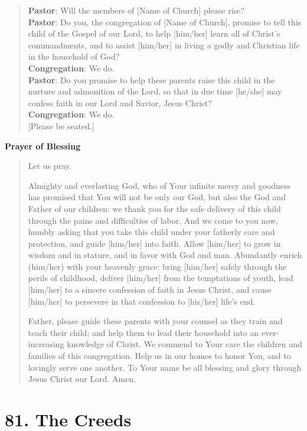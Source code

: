 \documentclass[
]{book}
\begin{document}
\begin{quote}
\textbf{Pastor}: Will the members of {[}Name of Church{]} please rise?\\
\textbf{Pastor}: Do you, the congregation of {[}Name of Church{]}, promise to tell this child of the Gospel of our Lord, to help {[}him/her{]} learn all of Christ's commandments, and to assist {[}him/her{]} in living a godly and Christian life in the household of God?\\
\textbf{Congregation}: We do.\\
\textbf{Pastor}: Do you promise to help these parents raise this child in the nurture and admonition of the Lord, so that in due time {[}he/she{]} may confess faith in our Lord and Savior, Jesus Christ?\\
\textbf{Congregation}: We do.\\
{[}Please be seated.{]}
\end{quote}

\textbf{Prayer of Blessing}

\begin{quote}
Let us pray.

Almighty and everlasting God, who of Your infinite mercy and goodness has promised that You will not be only our God, but also the God and Father of our children: we thank you for the safe delivery of this child through the pains and difficulties of labor. And we come to you now, humbly asking that you take this child under your fatherly care and protection, and guide {[}him/her{]} into faith. Allow {[}him/her{]} to grow in wisdom and in stature, and in favor with God and man. Abundantly enrich (him/her) with your heavenly grace: bring {[}him/her{]} safely through the perils of childhood, deliver {[}him/her{]} from the temptations of youth, lead {[}him/her{]} to a sincere confession of faith in Jesus Christ, and cause {[}him/her{]} to persevere in that confession to {[}his/her{]} life's end.

Father, please guide these parents with your counsel as they train and teach their child; and help them to lead their household into an ever-increasing knowledge of Christ. We commend to Your care the children and families of this congregation. Help us in our homes to honor You, and to lovingly serve one another. To Your name be all blessing and glory through Jesus Christ our Lord. Amen.
\end{quote}

\hypertarget{the-creeds}{%
\section*{81. The Creeds}\label{the-creeds}}
\end{document}
